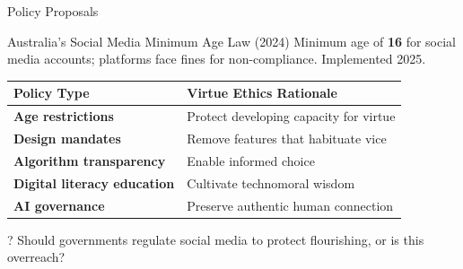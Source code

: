 \documentclass[aspectratio=169]{beamer}
\begin{document}
\begin{frame}{Policy Proposals}
\begin{block}{Australia's Social Media Minimum Age Law (2024)}
Minimum age of \textbf{16} for social media accounts; platforms face fines for non-compliance. Implemented 2025.
\end{block}

\vspace{0.2cm}
\begin{table}[h]
\centering
\small
\begin{tabular}{>{\bfseries}l p{6cm}}
\toprule
Policy Type & Virtue Ethics Rationale \\
\midrule
Age restrictions & Protect developing capacity for virtue \\
Design mandates & Remove features that habituate vice \\
Algorithm transparency & Enable informed choice \\
Digital literacy education & Cultivate technomoral wisdom \\
AI governance & Preserve authentic human connection \\
\bottomrule
\end{tabular}
\end{table}

\begin{alertblock}{?}
Should governments regulate social media to protect flourishing, or is this overreach?
\end{alertblock}
\end{frame}
\end{document}
